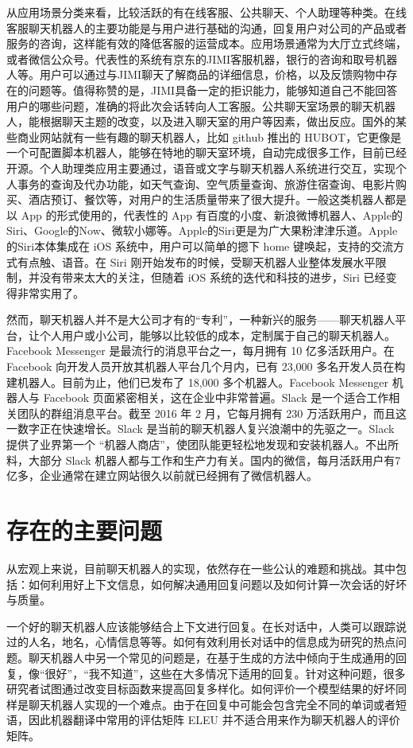 \documentclass[bachelor,winfonts]{jnuthesis}
\begin{document}
从应用场景分类来看，比较活跃的有在线客服、公共聊天、个人助理等种类\cite{chinaAI}。在线客服聊天机器人的主要功能是与用户进行基础的沟通，回复用户对公司的产品或者服务的咨询，这样能有效的降低客服的运营成本。应用场景通常为大厅立式终端，或者微信公众号。代表性的系统有京东的JIMI客服机器，银行的咨询和取号机器人等。用户可以通过与JIMI聊天了解商品的详细信息，价格，以及反馈购物中存在的问题等。值得称赞的是，JIMI具备一定的拒识能力，能够知道自己不能回答用户的哪些问题，准确的将此次会话转向人工客服。公共聊天室场景的聊天机器人，能根据聊天主题的改变，以及进入聊天室的用户等因素，做出反应。国外的某些商业网站就有一些有趣的聊天机器人，比如 github 推出的 HUBOT，它更像是一个可配置脚本机器人，能够在特地的聊天室环境，自动完成很多工作，目前已经开源。个人助理类应用主要通过，语音或文字与聊天机器人系统进行交互，实现个人事务的查询及代办功能，如天气查询、空气质量查询、旅游住宿查询、电影片购买、酒店预订、餐饮等，对用户的生活质量带来了很大提升。一般这类机器人都是以 App 的形式使用的，代表性的 App  有百度的小度、新浪微博机器人、Apple的Siri、Google的Now、微软小娜等。Apple的Siri更是为广大果粉津津乐道。Apple的Siri本体集成在 iOS 系统中，用户可以简单的摁下 home 键唤起，支持的交流方式有点触、语音。在 Siri 刚开始发布的时候，受聊天机器人业整体发展水平限制，并没有带来太大的关注，但随着 iOS 系统的迭代和科技的进步，Siri 已经变得非常实用了。

然而，聊天机器人并不是大公司才有的“专利”，一种新兴的服务——聊天机器人平台，让个人用户或小公司，能够以比较低的成本，定制属于自己的聊天机器人。Facebook Messenger 是最流行的消息平台之一，每月拥有 10 亿多活跃用户。在 Facebook 向开发人员开放其机器人平台几个月内，已有 23,000 多名开发人员在构建机器人。目前为止，他们已发布了 18,000 多个机器人。Facebook Messenger 机器人与 Facebook 页面紧密相关，这在企业中非常普遍。Slack 是一个适合工作相关团队的群组消息平台。截至 2016 年 2 月，它每月拥有 230 万活跃用户，而且这一数字正在快速增长。Slack 是当前的聊天机器人复兴浪潮中的先驱之一。Slack 提供了业界第一个 “机器人商店”，使团队能更轻松地发现和安装机器人。不出所料，大部分 Slack 机器人都与工作和生产力有关。国内的微信，每月活跃用户有7亿多，企业通常在建立网站很久以前就已经拥有了微信机器人。


\section{存在的主要问题}
从宏观上来说，目前聊天机器人的实现，依然存在一些公认的难题和挑战。其中包括：如何利用好上下文信息，如何解决通用回复问题以及如何计算一次会话的好坏与质量。

一个好的聊天机器人应该能够结合上下文进行回复。在长对话中，人类可以跟踪说过的人名，地名，心情信息等等。如何有效利用长对话中的信息成为研究的热点问题。聊天机器人中另一个常见的问题是，在基于生成的方法中倾向于生成通用的回复，像“很好”，“我不知道”，这些在大多情况下适用的回复。针对这种问题，很多研究者试图通过改变目标函数来提高回复多样化。如何评价一个模型结果的好坏同样是聊天机器人实现的一个难点。由于在回复中可能会包含完全不同的单词或者短语，因此机器翻译中常用的评估矩阵 ELEU 并不适合用来作为聊天机器人的评价矩阵。
\end{document}
